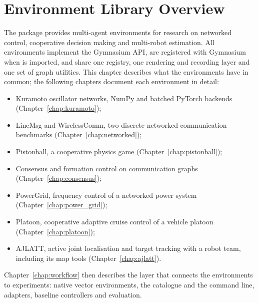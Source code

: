 \begingroup
\setlength{\emergencystretch}{3em}
\chapter{Environment Library Overview}\label{chap:envlib}

The  package provides multi-agent environments for research on
networked control, cooperative decision making and multi-robot estimation. All
environments implement the Gymnasium API, are registered with Gymnasium when
 is imported, and share one registry, one rendering and
recording layer and one set of graph utilities. This chapter describes what
the environments have in common; the following chapters document each
environment in detail:

\begin{itemize}
  \item Kuramoto oscillator networks, NumPy and batched PyTorch backends
        (Chapter~\ref{chap:kuramoto});
  \item LineMsg and WirelessComm, two discrete networked communication
        benchmarks (Chapter~\ref{chap:networked});
  \item Pistonball, a cooperative physics game (Chapter~\ref{chap:pistonball});
  \item Consensus and formation control on communication graphs
        (Chapter~\ref{chap:consensus});
  \item PowerGrid, frequency control of a networked power system
        (Chapter~\ref{chap:power_grid});
  \item Platoon, cooperative adaptive cruise control of a vehicle platoon
        (Chapter~\ref{chap:platoon});
  \item AJLATT, active joint localisation and target tracking with a robot
        team, including its map tools (Chapter~\ref{chap:ajlatt}).
\end{itemize}

Chapter~\ref{chap:workflow} then describes the layer that connects the
environments to experiments: native vector environments, the catalogue and
the  command line, adapters, baseline controllers and
evaluation.

